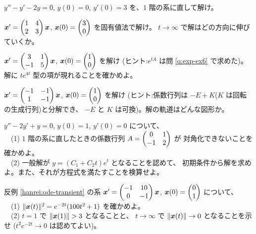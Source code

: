 \begin{mondai}[基本]\label{q:ode-ex4}
$y'' - y' - 2y = 0$, $y(0) = 0$, $y'(0) = 3$ を、$1$ 階の系に直して解け。
\end{mondai}

\begin{mondai}[標準]\label{q:ode-ex5}
$\bm{x}' = \begin{pmatrix}1 & 4 \\ 2 & 3\end{pmatrix}\bm{x}$,
$\bm{x}(0) = \begin{pmatrix}3 \\ 0\end{pmatrix}$ を固有値法で解け。
$t \to \infty$ で解はどの方向に伸びていくか。
\end{mondai}

\begin{mondai}[標準]\label{q:ode-ex6}
$\bm{x}' = \begin{pmatrix}3 & 1 \\ -1 & 5\end{pmatrix}\bm{x}$,
$\bm{x}(0) = \begin{pmatrix}1 \\ 0\end{pmatrix}$ を解け
(ヒント:$e^{tA}$ は問 \ref{q:exp-ex6} で求めた)。
解に $te^{4t}$ 型の項が現れることを確かめよ。
\end{mondai}

\begin{mondai}[標準]\label{q:ode-ex7}
$\bm{x}' = \begin{pmatrix}-1 & -1 \\ 1 & -1\end{pmatrix}\bm{x}$,
$\bm{x}(0) = \begin{pmatrix}1 \\ 0\end{pmatrix}$ を解け
(ヒント:係数行列は $-E + K$($K$ は回転の生成行列)と分解でき、
$-E$ と $K$ は可換)。解の軌道はどんな図形か。
\end{mondai}

\begin{mondai}[標準]\label{q:ode-ex8}
$y'' - 2y' + y = 0$, $y(0) = 1$, $y'(0) = 0$ について、\\
　(1) $1$ 階の系に直したときの係数行列 $A = \begin{pmatrix}0 & 1 \\ -1 & 2\end{pmatrix}$ が
対角化できないことを確かめよ。\\
　(2) 一般解が $y = (C_1 + C_2 t)e^{t}$ となることを認めて、
初期条件から解を求めよ。また、それが方程式を満たすことを検算せよ。
\end{mondai}

\begin{mondai}[発展]\label{q:ode-ex9}
反例 \ref{hanrei:ode-transient} の系
$\bm{x}' = \begin{pmatrix}-1 & 10 \\ 0 & -1\end{pmatrix}\bm{x}$,
$\bm{x}(0) = \begin{pmatrix}0 \\ 1\end{pmatrix}$ について、\\
　(1) $\|\bm{x}(t)\|^2 = e^{-2t}(100t^2 + 1)$ を確かめよ。\\
　(2) $t = 1$ で $\|\bm{x}(1)\| > 3$ となることと、
$t \to \infty$ で $\|\bm{x}(t)\| \to 0$ となることを示せ
($t^2 e^{-2t} \to 0$ は認めてよい)。
\end{mondai}

